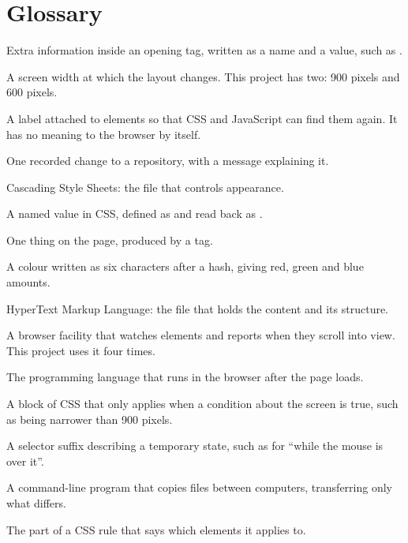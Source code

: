 \documentclass[11pt,a4paper]{article}
\begin{document}
\section{Glossary}

\begin{description}[leftmargin=0pt,style=nextline]
\item[Attribute] Extra information inside an opening tag, written as a name and a
  value, such as .
\item[Breakpoint] A screen width at which the layout changes. This project has
  two: 900 pixels and 600 pixels.
\item[Class] A label attached to elements so that CSS and JavaScript can find
  them again. It has no meaning to the browser by itself.
\item[Commit] One recorded change to a repository, with a message explaining it.
\item[CSS] Cascading Style Sheets: the file that controls appearance.
\item[Custom property] A named value in CSS, defined as  and
  read back as .
\item[Element] One thing on the page, produced by a tag.
\item[Hex colour] A colour written as six characters after a hash, giving red,
  green and blue amounts.
\item[HTML] HyperText Markup Language: the file that holds the content and its
  structure.
\item[IntersectionObserver] A browser facility that watches elements and reports
  when they scroll into view. This project uses it four times.
\item[JavaScript] The programming language that runs in the browser after the
  page loads.
\item[Media query] A block of CSS that only applies when a condition about the
  screen is true, such as being narrower than 900 pixels.
\item[Pseudo-class] A selector suffix describing a temporary state, such as
   for ``while the mouse is over it''.
\item[rsync] A command-line program that copies files between computers,
  transferring only what differs.
\item[Selector] The part of a CSS rule that says which elements it applies to.

\end{description}
\end{document}
